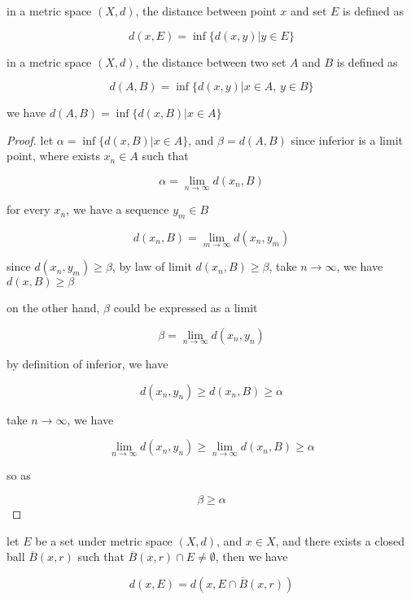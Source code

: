 \documentclass[11pt,a4paper]{article}
\begin{document}
\begin{definition}[Distance]
    in a metric space $(X,d)$, the distance between point $x$ and set $E$ is defined as

    \[
        d(x, E) = \inf \{ d(x,y) \vert y \in E \}
    \]
\end{definition}

\begin{definition}[Distance]
    in a metric space $(X, d)$, the distance between two set $A$ and $B$ is defined as 

    \[
        d(A, B) = \inf \{ d(x,y) \vert x \in A,\, y \in B \}
    \]
\end{definition}

\begin{lem}
    we have $d(A,B) = \inf \{ d(x,B) \vert x \in A \}$
\end{lem}

\begin{proof}
    let $\alpha = \inf \{ d(x,B) \vert x \in A \}$, and $\beta = d(A,B)$ since inferior is a limit point, where exists $x_n \in A$ such that

    \[
        \alpha = \lim_{n \to \infty}d(x_n, B)
    \]

    for every $x_n$, we have a sequence $y_m \in B$

    \[
        d(x_n, B) = \lim_{m \to \infty}d(x_n, y_m)
    \]

    since $d(x_n, y_m) \ge \beta$, by law of limit $d(x_n, B) \ge \beta$, take $n \to \infty$, we have $d(x, B) \ge \beta$

    on the other hand, $\beta$ could be expressed as a limit 

    \[
        \beta = \lim_{n \to \infty}d(x_n, y_n)
    \]

    by definition of inferior, we have

    \[
        d(x_n, y_n) \ge d(x_n, B) \ge \alpha
    \]
    
    take $n \to \infty$, we have 

    \[
        \lim_{n \to \infty}d(x_n, y_n ) \ge \lim_{n \to \infty}d(x_n, B) \ge \alpha
    \]

    so as

    \[
        \beta \ge \alpha
    \]

\end{proof}

\begin{lem}
    let $E$ be a set under metric space $(X,d)$, and $x \in X$, and there exists a closed ball $\overline{B}(x, r)$
    such that $\overline{B}(x,r) \cap E \ne \emptyset$, then we have

    \[
        d(x, E) = d(x, E \cap \overline{B}(x,r))
    \]
\end{lem}
\end{document}
